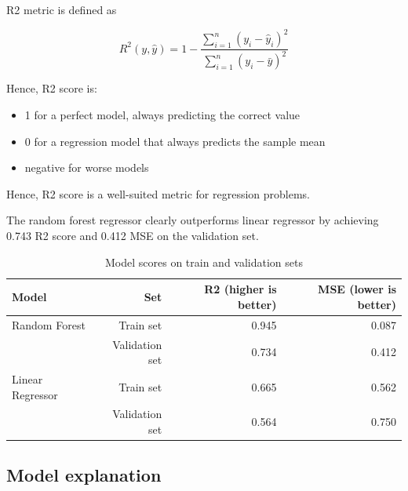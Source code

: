\documentclass[conference]{IEEEtran}
\begin{document}
R2 metric is defined as 

\begin{equation}
    R^2(y, \hat{y}) = 1 - \frac{\sum_{i=1}^{n} (y_i - \hat{y}_i)^2}{\sum_{i=1}^{n} (y_i - \bar{y})^2} \label{eq:r2}
\end{equation}

Hence, R2 score is:
\begin{itemize}
    \item 1 for a perfect model, always predicting the correct value
    \item 0 for a regression model that always predicts the sample mean
    \item negative for worse models
\end{itemize}
Hence, R2 score is a well-suited metric for regression problems. 

The random forest regressor clearly outperforms linear regressor 
by achieving 0.743 R2 score and 0.412 MSE on the validation set.

\begin{table}[htbp]
    \caption{Model scores on train and validation sets}
\begin{center}
\begin{tabular}{lrrr}
    \hline
    {Model} & Set &  R2 (higher is better) &  MSE (lower is better) \\
    \hline
    Random Forest    & Train set      & 0.945 & 0.087 \\
                     & Validation set & 0.734 & 0.412 \\
    Linear Regressor & Train set      & 0.665 & 0.562 \\
                     & Validation set & 0.564 & 0.750 \\
    \hline
\end{tabular}
\label{table:model-scores}
\end{center}
\end{table}

\subsection{Model explanation}
\end{document}
